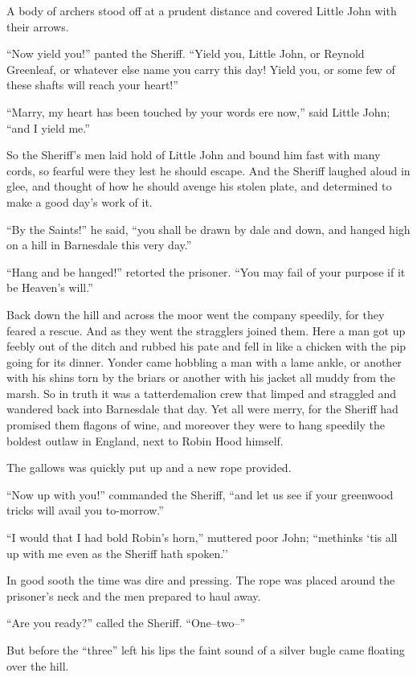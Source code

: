 A body of archers stood off at a prudent distance and covered Little
John with their arrows.

``Now yield you!'' panted the Sheriff. ``Yield you, Little John, or
Reynold Greenleaf, or whatever else name you carry this day! Yield you,
or some few of these shafts will reach your heart!''

``Marry, my heart has been touched by your words ere now,'' said Little
John; ``and I yield me.''

So the Sheriff's men laid hold of Little John and bound him fast with
many cords, so fearful were they lest he should escape. And the Sheriff
laughed aloud in glee, and thought of how he should avenge his stolen
plate, and determined to make a good day's work of it.

``By the Saints!'' he said, ``you shall be drawn by dale and down, and
hanged high on a hill in Barnesdale this very day.''

``Hang and be hanged!'' retorted the prisoner. ``You may fail of your
purpose if it be Heaven's will.''

Back down the hill and across the moor went the company speedily, for
they feared a rescue. And as they went the stragglers joined them. Here
a man got up feebly out of the ditch and rubbed his pate and fell in
like a chicken with the pip going for its dinner. Yonder came hobbling a
man with a lame ankle, or another with his shins torn by the briars or
another with his jacket all muddy from the marsh. So in truth it was a
tatterdemalion crew that limped and straggled and wandered back into
Barnesdale that day. Yet all were merry, for the Sheriff had promised
them flagons of wine, and moreover they were to hang speedily the
boldest outlaw in England, next to Robin Hood himself.

The gallows was quickly put up and a new rope provided.

``Now up with you!'' commanded the Sheriff, ``and let us see if your
greenwood tricks will avail you to-morrow.''

``I would that I had bold Robin's horn,'' muttered poor John; ``methinks
`tis all up with me even as the Sheriff hath spoken.''

In good sooth the time was dire and pressing. The rope was placed around
the prisoner's neck and the men prepared to haul away.

``Are you ready?'' called the Sheriff. ``One--two--''

But before the ``three'' left his lips the faint sound of a silver bugle
came floating over the hill.


